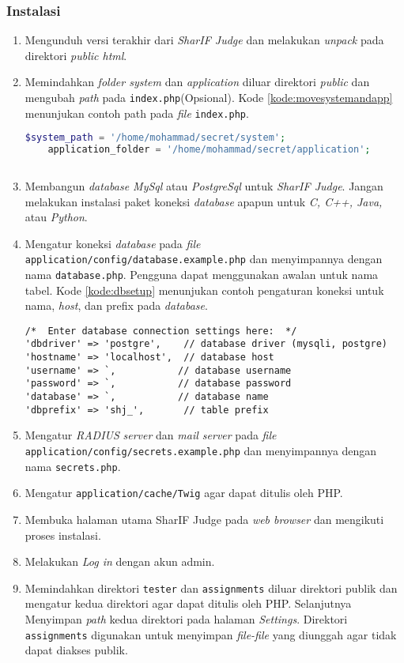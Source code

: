\subsubsection{Instalasi}
\begin{enumerate}
\item Mengunduh versi terakhir dari \textit{SharIF Judge} dan melakukan \textit{unpack} pada direktori \textit{public html}.
\item Memindahkan \textit{folder system} dan \textit{application} diluar direktori \textit{public} dan mengubah \textit{path} pada \verb|index.php|(Opsional). Kode \ref{kode:movesystemandapp} menunjukan contoh path pada \textit{file} \texttt{index.php}.

\begin{lstlisting}[language=PHP, caption=Contoh \textit{path} pada halaman index.php, label=kode:movesystemandapp]
	$system_path = '/home/mohammad/secret/system';
	application_folder = '/home/mohammad/secret/application';
	
\end{lstlisting}
\item Membangun \textit{database MySql} atau \textit{PostgreSql} untuk \textit{SharIF Judge}. Jangan melakukan instalasi paket koneksi \textit{database} apapun untuk \textit{C, C++, Java,} atau \textit{Python}.
\item Mengatur koneksi \textit{database} pada \textit{file} \verb|application/config/database.example.php| dan menyimpannya dengan nama \verb|database.php|. Pengguna dapat menggunakan awalan untuk nama tabel. Kode \ref{kode:dbsetup} menunjukan contoh pengaturan koneksi untuk nama, \textit{host}, dan prefix pada \textit{database}.

\begin{lstlisting}[caption=Contoh pengaturan koneksi untuk \textit{database}, label=kode:dbsetup]
/*  Enter database connection settings here:  */
'dbdriver' => 'postgre',    // database driver (mysqli, postgre)
'hostname' => 'localhost',  // database host
'username' => `,           // database username
'password' => `,           // database password
'database' => `,           // database name
'dbprefix' => 'shj_',       // table prefix
\end{lstlisting}
\item Mengatur \textit{RADIUS} \textit{server} dan \textit{mail server} pada \textit{file} \verb|application/config/secrets.example.php| dan menyimpannya dengan nama \verb|secrets.php|.
\item Mengatur \verb|application/cache/Twig| agar dapat ditulis oleh PHP.
\item Membuka halaman utama SharIF Judge pada \textit{web browser} dan mengikuti proses instalasi.
\item Melakukan \textit{Log in} dengan akun admin.
\item Memindahkan direktori \verb|tester| dan \verb|assignments| diluar direktori publik dan mengatur kedua direktori agar dapat ditulis oleh PHP. Selanjutnya Menyimpan \textit{path} kedua direktori pada halaman \textit{Settings}. Direktori \verb|assignments| digunakan untuk menyimpan \textit{file-file} yang diunggah agar tidak dapat diakses publik.


\end{enumerate}
